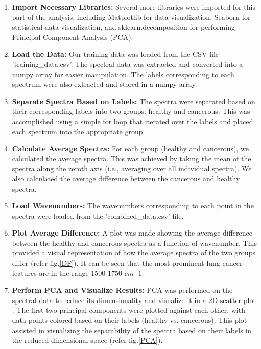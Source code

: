 \documentclass{cernatsnote}
\begin{document}
\begin{enumerate}

\item \textbf{Import Necessary Libraries:} Several more libraries were imported for this part of the analysis, including Matplotlib for data visualization, Seaborn for statistical data visualization, and sklearn.decomposition for performing Principal Component Analysis (PCA).

\item \textbf{Load the Data:} Our training data was loaded from the CSV file 'training\_data.csv'. The spectral data was extracted and converted into a numpy array for easier manipulation. The labels corresponding to each spectrum were also extracted and stored in a numpy array.

\item \textbf{Separate Spectra Based on Labels:} The spectra were separated based on their corresponding labels into two groups: healthy and cancerous. This was accomplished using a simple for loop that iterated over the labels and placed each spectrum into the appropriate group.

\item \textbf{Calculate Average Spectra:} For each group (healthy and cancerous), we calculated the average spectra. This was achieved by taking the mean of the spectra along the zeroth axis (i.e., averaging over all individual spectra). We also calculated the average difference between the cancerous and healthy spectra.

\item \textbf{Load Wavenumbers:} The wavenumbers corresponding to each point in the spectra were loaded from the 'combined\_data.csv' file.

\item \textbf{Plot Average Difference:} A plot was made showing the average difference between the healthy and cancerous spectra as a function of wavenumber. This provided a visual representation of how the average spectra of the two groups differ (refer fig.\ref{DF}). It can be seen that the most prominent lung cancer features are in the range 1500-1750 $cm^-1$.  

\item \textbf{Perform PCA and Visualize Results:} PCA was performed on the spectral data to reduce its dimensionality and visualize it in a 2D scatter plot \cite{PCA}. The first two principal components were plotted against each other, with data points colored based on their labels (healthy vs. cancerous). This plot assisted in visualizing the separability of the spectra based on their labels in the reduced dimensional space (refer fig.\ref{PCA}).
\end{enumerate}
\end{document}
